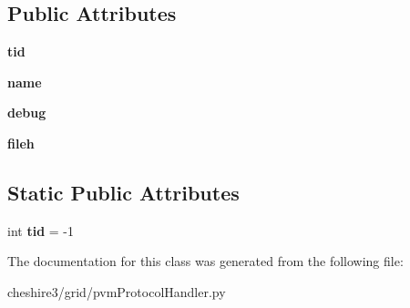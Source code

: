 \subsection*{Public Attributes}
\begin{DoxyCompactItemize}
\item 
\hypertarget{classcheshire3_1_1grid_1_1pvm_protocol_handler_1_1_task_a39a274aca91fc9f3931ff6e5ea6c2ae3}{{\bfseries tid}}\label{classcheshire3_1_1grid_1_1pvm_protocol_handler_1_1_task_a39a274aca91fc9f3931ff6e5ea6c2ae3}

\item 
\hypertarget{classcheshire3_1_1grid_1_1pvm_protocol_handler_1_1_task_a60a9f992106d34546c2e105a812f82b3}{{\bfseries name}}\label{classcheshire3_1_1grid_1_1pvm_protocol_handler_1_1_task_a60a9f992106d34546c2e105a812f82b3}

\item 
\hypertarget{classcheshire3_1_1grid_1_1pvm_protocol_handler_1_1_task_aab9d015b6a430825adab497280a99bd6}{{\bfseries debug}}\label{classcheshire3_1_1grid_1_1pvm_protocol_handler_1_1_task_aab9d015b6a430825adab497280a99bd6}

\item 
\hypertarget{classcheshire3_1_1grid_1_1pvm_protocol_handler_1_1_task_aeae75220afbeeab0ba1e21ba8025672b}{{\bfseries fileh}}\label{classcheshire3_1_1grid_1_1pvm_protocol_handler_1_1_task_aeae75220afbeeab0ba1e21ba8025672b}

\end{DoxyCompactItemize}
\subsection*{Static Public Attributes}
\begin{DoxyCompactItemize}
\item 
\hypertarget{classcheshire3_1_1grid_1_1pvm_protocol_handler_1_1_task_a6ee2ede6322e02df2694bb8e6513ac60}{int {\bfseries tid} = -\/1}\label{classcheshire3_1_1grid_1_1pvm_protocol_handler_1_1_task_a6ee2ede6322e02df2694bb8e6513ac60}

\end{DoxyCompactItemize}


The documentation for this class was generated from the following file\-:\begin{DoxyCompactItemize}
\item 
cheshire3/grid/pvm\-Protocol\-Handler.\-py\end{DoxyCompactItemize}
